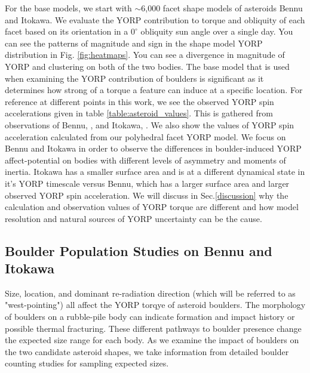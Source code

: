For the base models, we start with $\sim$6,000 facet shape models of asteroids Bennu and Itokawa. We evaluate the YORP contribution to torque and obliquity of each facet based on its orientation in a $0^{\circ}$ obliquity sun angle over a single day. You can see the patterns of magnitude and sign in the shape model YORP distribution in Fig. \ref{fig:heatmaps}. You can see a divergence in magnitude of YORP and clustering on both of the two bodies. The base model that is used when examining the YORP contribution of boulders is significant as it determines how strong of a torque a feature can induce at a specific location. For reference at different points in this work, we see the observed YORP spin accelerations given in table \ref{table:asteroid_values}. This is gathered from observations of Bennu, \citep{Daly2020} \citep{Scheeres2016} \citep{Hergenrother2019}, and Itokawa, \citep{Fujiwara2006} \citep{Lowry2007} \citep{Breiter2009}. We also show the values of YORP spin acceleration calculated from our polyhedral facet YORP model. We focus on Bennu and Itokawa in order to observe the differences in boulder-induced YORP affect-potential on bodies with different levels of asymmetry and moments of inertia. Itokawa has a smaller surface area and is at a different dynamical state in it's YORP timescale versus Bennu, which has a larger surface area and larger observed YORP spin acceleration. We will discuss in Sec.\ref{discussion} why the calculation and observation values of YORP torque are different and how model resolution and natural sources of YORP uncertainty can be the cause.


\subsection{Boulder Population Studies on Bennu and Itokawa} \label{BP}

Size, location, and dominant re-radiation direction (which will be referred to as "west-pointing") all affect the YORP torqye of asteroid boulders. The morphology of boulders on a rubble-pile body can indicate formation and impact history or possible thermal fracturing. These different pathways to boulder presence change the expected size range for each body. As we examine the impact of boulders on the two candidate asteroid shapes, we take information from detailed boulder counting studies for sampling expected sizes. 


